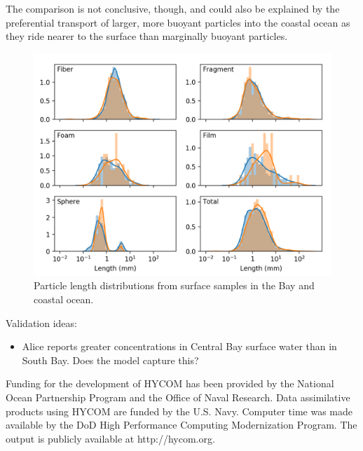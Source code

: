 \documentclass[draft]{jgr/agujournal2019}
\begin{document}
The comparison is not conclusive, though, and could also be explained
by the preferential transport of larger, more buoyant particles into the
coastal ocean as they ride nearer to the surface than marginally buoyant
particles.

\begin{figure}
  \includegraphics{figures/manta-bay_vs_coast-length_distribution.png}
  \caption{Particle length distributions from surface samples in the Bay and
    coastal ocean.}
  \label{surface_size_distributions}
\end{figure}

Validation ideas:
\begin{itemize}
  \item Alice reports greater concentrations in Central Bay surface
    water than in South Bay. Does the model capture this?
\end{itemize}


Funding for the development of HYCOM has been provided by the National
Ocean Partnership Program and the Office of Naval Research. Data
assimilative products using HYCOM are funded by the
U.S. Navy. Computer time was made available by the DoD High
Performance Computing Modernization Program. The output is publicly
available at http://hycom.org.


\end{document}
